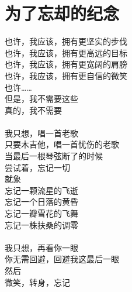 \chapter{为了忘却的纪念}

\leftskip=25mm
\noindent
也许，我应该，拥有更坚实的步伐\\
也许，我应该，拥有更高远的目标\\
也许，我应该，拥有更宽阔的肩膀\\
也许，我应该，拥有更自信的微笑\\
也许……\\
但是，我不需要这些\\
真的，我不需要\\
\\
我只想，唱一首老歌\\
只要木吉他，唱一首忧伤的老歌\\
当最后一根琴弦断了的时候\\
尝试着，忘记一切\\
就象\\
忘记一颗流星的飞逝\\
忘记一个日落的黄昏\\
忘记一瓣雪花的飞舞\\
忘记一株扶桑的调零\\
\\
我只想，再看你一眼\\
你无需回避，回避我这最后一眼\\
然后\\
微笑，转身，忘记

